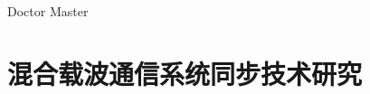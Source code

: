 \documentclass[cs4size,openany,UTF8]{ctexbook}
\begin{document}
\newif\ifxueweidoctor
\newif\ifxueweimaster
\def\temp{Doctor}
\ifx\temp\xuewei
  \xueweidoctortrue  \xueweimasterfalse
\fi
\def\temp{Master}
\ifx\temp\xuewei
  \xueweidoctorfalse  \xueweimastertrue
\fi





\chapter{混合载波通信系统同步技术研究}







\addtolength{\bibsep}{-0.8em}
\nocite{*}

\end{document}
